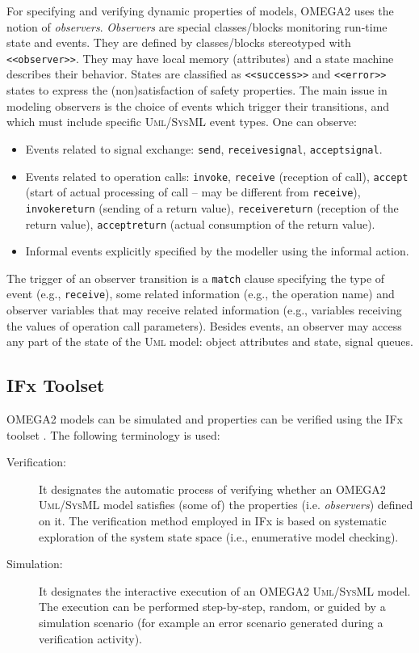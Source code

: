 \documentclass[a4paper,twoside]{article}
\def\sysml{\textsc{SysML}}
\def\uml{\textsc{Uml}}
\begin{document}
For specifying and verifying dynamic properties of models, OMEGA2 uses the notion of \textit{observers}. \textit{Observers} are special classes/blocks monitoring run-time state and events. They are defined by classes/blocks stereotyped with \texttt{<<observer>>}. They may have local memory (attributes) and a state machine describes their behavior. States are classified as \texttt{<<success>>} and \texttt{<<error>>} states to express the (non)satisfaction of safety properties. The main issue in modeling observers is the choice of events which trigger their transitions, and which must include specific \uml{}/\sysml{} event types. One can observe:

\begin{itemize}
\item Events related to signal exchange: \texttt{send}, \texttt{receivesignal}, \texttt{acceptsignal}.
\item Events related to operation calls: \texttt{invoke}, \texttt{receive} (reception of call), \texttt{accept} (start of actual processing of call -- may be different from \texttt{receive}), \texttt{invokereturn} (sending of a 
return 	value), \texttt{receivereturn} (reception of the return value), \texttt{acceptreturn} (actual consumption of the return value).
\item Informal events explicitly specified by the modeller using the informal action.
\end{itemize}
The trigger of an observer transition is a \texttt{match} clause specifying the type of event (e.g., \texttt{receive}), some related information (e.g., the operation name) and observer variables that may receive related information (e.g., variables receiving the values of operation call parameters). Besides events, an observer may access any part of the state of the \uml{} model: object attributes and state, signal queues. 


\subsection{IFx Toolset}

\noindent OMEGA2 models can be simulated and properties can be verified using the IFx toolset \cite{test15}. The following terminology is used: 

\begin{description}
\item[Verification:] It designates  the  automatic  process  of  verifying  whether  an  OMEGA2  \uml{}/\sysml{} model  satisfies  (some  of)  the  properties  (i.e. \textit{observers})  defined  on  it.  The  verification  method employed in IFx is based on systematic exploration of the system state space (i.e., enumerative model checking). 
\item[Simulation:] It designates  the  interactive  execution  of  an  OMEGA2  \uml{}/\sysml{}  model.  The execution  can    be  performed  step-by-step,  random,  or  guided  by  a  simulation  scenario  (for example an error scenario generated during a verification activity). 
\end{description}
\end{document}
